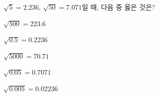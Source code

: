 $\sqrt{5}=2.236$, $\sqrt{50}=7.071$일 때, 다음 중 옳은 것은?
\begin{choicesii}{\rule[-3ex]{0pt}{8ex}$\sqrt{500}=223.6$}{\rule[-3ex]{0pt}{8ex}$\sqrt{0.5}=0.2236$}{\rule[-3ex]{0pt}{8ex}$\sqrt{5000}=70.71$}{\rule[-3ex]{0pt}{8ex}$\sqrt{0.05}=0.7071$}{\rule[-3ex]{0pt}{8ex}$\sqrt{0.005}=0.02236$}\end{choicesii}
